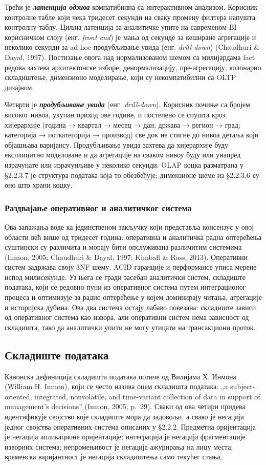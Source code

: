 Трећи је \textbf{\textit{латенција одзива}} компатибилна са интерактивном анализом. Корисник контролне табле који чека тридесет секунди на сваку промену филтера напушта контролну таблу. Циљна латенција за аналитичке упите на савременом BI корисничком слоју (енг. \textit{front end}) је мања од секунде за кеширане агрегације и неколико секунди за ad hoc продубљивање увида (енг. \textit{drill-down}) (Chaudhuri \& Dayal, 1997). Постизање овога над нормализованом шемом са милијардама fact редова захтева архитектонске изборе, денормализацију, пре-агрегацију, колонарно складиштење, димензионо моделирање, који су некомпатибилни са OLTP дизајном.

Четврти је \textbf{\textit{продубљивање увида}} (енг. \textit{drill-down}). Корисник почиње са бројем високог нивоа, укупан приход ове године, и постепено се спушта кроз хијерархије (година → квартал → месец → дан; држава → регион → град; категорија → поткатегорија → производ) све док не стигне до нивоа детаља који објашњава варијансу. Продубљивање увида захтева да хијерархије буду експлицитно моделоване и да агрегације на сваком нивоу буду или унапред израчунате или израчунљиве у неколико секунди. OLAP коцка разматрана у §2.2.3.7 је структура података која то обезбеђује; димензионе шеме из §2.2.3.6 су оно што храни коцку.

\subsubsection{Раздвајање оперативног и аналитичког система}
Ова запажања воде ка јединственом закључку који представља консензус у овој области већ више од тридесет година: оперативна и аналитичка радна оптерећења суштински су различита и морају бити опслуживана различитим системима (Inmon, 2005; Chaudhuri \& Dayal, 1997; Kimball \& Ross, 2013). Оперативни систем задржава своју 3NF шему, ACID гаранције и перформансе уписа мерене испод милисекунде. Уз њега се гради засебан аналитички систем, складиште података, који се редовно пуни из оперативног система путем интеграционог процеса и оптимизује за радно оптерећење у којем доминирају читања, агрегације и историјска дубина. Ова два система остају лабаво повезана: складиште зависи од оперативног система као извора, али оперативни систем нема зависност од складишта, тако да аналитички упити не могу утицати на трансакциони проток.

\subsection{Складиште података}
Канонска дефиниција складишта података потиче од Вилијама Х. Инмона (William H. Inmon), који се често назива оцем складишта података: „a subject-oriented, integrated, nonvolatile, and time-variant collection of data in support of management’s decisions” (Inmon, 2005, p. 29). Сваки од ова четири придева идентификује својство које складиште мора да задовољи, а свако је негација једног својства оперативних система описаних у §2.2.2. Предметна оријентација је негација апликационе оријентације; интеграција је негација фрагментације изворних система; непромењивост је негација ажурирања на лицу места; временска варијантност је негација складиштења само текућег стања.

